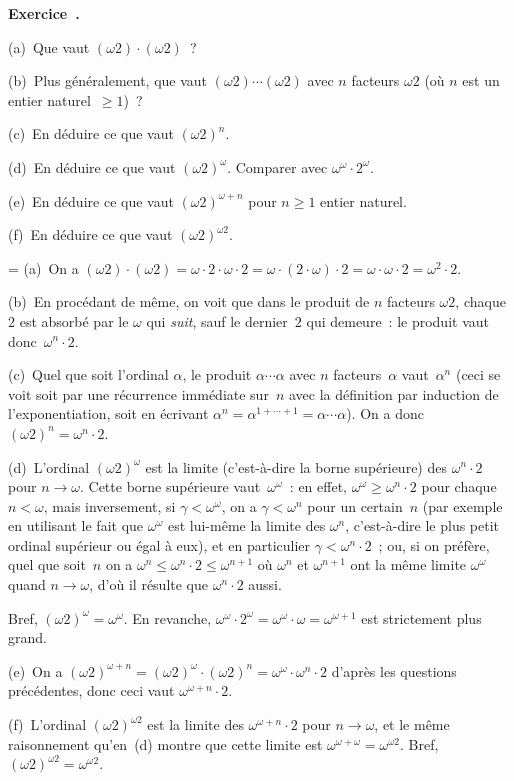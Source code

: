 \documentclass[12pt,a4paper]{article}
\theoremstyle{definition}
\newcommand\exercice{%
\refstepcounter{comcnt}\bigskip\noindent\textbf{Exercice~\thecomcnt.}\par\nobreak}
\newif\ifcorrige
\newenvironment{corrige}%
{\ifcorrige\relax\else\setbox0=\vbox\bgroup\fi%
\smallbreak\noindent{\underbar{\textit{Corrigé.}}\quad}}
{{\hbox{}\nobreak\hfill\checkmark}%
\ifcorrige\relax\else\egroup\fi\par}
\begin{document}
%
%
%

\exercice

(a) Que vaut $(\omega 2) \cdot (\omega 2)$ ?

(b) Plus généralement, que vaut $(\omega 2) \cdots (\omega 2)$ avec
$n$ facteurs $\omega 2$ (où $n$ est un entier naturel $\geq 1$) ?

(c) En déduire ce que vaut $(\omega 2)^n$.

(d) En déduire ce que vaut $(\omega 2)^\omega$.  Comparer avec
$\omega^\omega \cdot 2^\omega$.

(e) En déduire ce que vaut $(\omega 2)^{\omega+n}$ pour $n\geq 1$
entier naturel.

(f) En déduire ce que vaut $(\omega 2)^{\omega 2}$.

\begin{corrige}
(a) On a $(\omega 2) \cdot (\omega 2) = \omega \cdot 2 \cdot \omega
  \cdot 2 = \omega \cdot (2 \cdot \omega) \cdot 2 = \omega \cdot
  \omega \cdot 2 = \omega^2 \cdot 2$.

(b) En procédant de même, on voit que dans le produit de $n$ facteurs
  $\omega 2$, chaque $2$ est absorbé par le $\omega$ qui \emph{suit},
  sauf le dernier $2$ qui demeure : le produit vaut donc $\omega^n
  \cdot 2$.

(c) Quel que soit l'ordinal $\alpha$, le produit $\alpha \cdots
  \alpha$ avec $n$ facteurs $\alpha$ vaut $\alpha^n$ (ceci se voit
  soit par une récurrence immédiate sur $n$ avec la définition par
  induction de l'exponentiation, soit en écrivant $\alpha^n =
  \alpha^{1+\cdots+1} = \alpha \cdots \alpha$).  On a donc $(\omega
  2)^n = \omega^n \cdot 2$.

(d) L'ordinal $(\omega 2)^\omega$ est la limite (c'est-à-dire la borne
  supérieure) des $\omega^n \cdot 2$ pour $n\to\omega$.  Cette borne
  supérieure vaut $\omega^\omega$ : en effet, $\omega^\omega \geq
  \omega^n \cdot 2$ pour chaque $n<\omega$, mais inversement, si
  $\gamma < \omega^\omega$, on a $\gamma < \omega^n$ pour un
  certain $n$ (par exemple en utilisant le fait que $\omega^\omega$
  est lui-même la limite des $\omega^n$, c'est-à-dire le plus petit
  ordinal supérieur ou égal à eux), et en particulier $\gamma <
  \omega^n \cdot 2$ ; ou, si on préfère, quel que soit $n$ on a
  $\omega^n \leq \omega^n \cdot 2 \leq \omega^{n+1}$ où $\omega^n$ et
  $\omega^{n+1}$ ont la même limite $\omega^\omega$ quand
  $n\to\omega$, d'où il résulte que $\omega^n \cdot 2$ aussi.

  Bref, $(\omega 2)^\omega = \omega^\omega$.  En revanche,
  $\omega^\omega \cdot 2^\omega = \omega^\omega \cdot \omega =
  \omega^{\omega+1}$ est strictement plus grand.

(e) On a $(\omega 2)^{\omega + n} = (\omega 2)^\omega \cdot (\omega
  2)^n = \omega^\omega \cdot \omega^n \cdot 2$ d'après les questions
  précédentes, donc ceci vaut $\omega^{\omega+n} \cdot 2$.

(f) L'ordinal $(\omega 2)^{\omega 2}$ est la limite des
  $\omega^{\omega+n} \cdot 2$ pour $n\to\omega$, et le même
  raisonnement qu'en (d) montre que cette limite est
  $\omega^{\omega+\omega} = \omega^{\omega 2}$.  Bref, $(\omega
  2)^{\omega 2} = \omega^{\omega 2}$.
\end{corrige}
\end{document}
